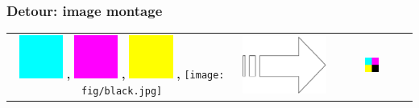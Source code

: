 \documentclass[english,serif,mathserif,xcolor=pdftex,dvipsnames,table]{beamer}
\begin{document}
\begin{frame}[fragile]
  \frametitle{Detour: image montage}


  \+
  \begin{tabular}[c]{ccc}
    \begin{minipage}[c]{0.45\linewidth}
      \includegraphics[width=0.2\textwidth]{fig/cyan.jpg}    \textbf{,}
      \includegraphics[width=0.2\textwidth]{fig/magenta.jpg} \textbf{,}
      \includegraphics[width=0.2\textwidth]{fig/yellow.jpg}  \textbf{,}
      \texttt{[image: fig/black.jpg]}
      \vspace{0.2\textheight}
    \end{minipage}
    &
    {\includegraphics[width=0.1\linewidth,totalheight=0.25\textheight]{fig/arrow.pdf}}
    &
    \includegraphics[width=0.2\textwidth]{fig/cmyk.jpg}
  \end{tabular}
\end{frame}
\end{document}
